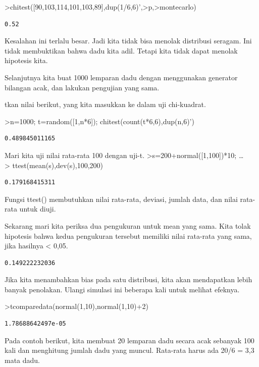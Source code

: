 \documentclass[
]{book}
\begin{document}
\textgreater chitest({[}90,103,114,101,103,89{]},dup(1/6,6)',\textgreater p,\textgreater montecarlo)

\begin{verbatim}
0.52
\end{verbatim}

Kesalahan ini terlalu besar. Jadi kita tidak bisa menolak distribusi seragam. Ini tidak membuktikan bahwa dadu kita adil. Tetapi kita tidak dapat menolak hipotesis kita.

Selanjutnya kita buat 1000 lemparan dadu dengan menggunakan generator bilangan acak, dan lakukan pengujian yang sama.

tkan nilai berikut, yang kita masukkan ke dalam uji chi-kuadrat.

\textgreater n=1000; t=random({[}1,n*6{]}); chitest(count(t*6,6),dup(n,6)')

\begin{verbatim}
0.489845011165
\end{verbatim}

Mari kita uji nilai rata-rata 100 dengan uji-t. \textgreater s=200+normal({[}1,100{]})*10; \ldots{}\\
\textgreater{} ttest(mean(s),dev(s),100,200)

\begin{verbatim}
0.179168415311
\end{verbatim}

Fungsi ttest() membutuhkan nilai rata-rata, deviasi, jumlah data, dan nilai rata-rata untuk diuji.

Sekarang mari kita periksa dua pengukuran untuk mean yang sama. Kita tolak hipotesis bahwa kedua pengukuran tersebut memiliki nilai rata-rata yang sama, jika hasilnya \textless{} 0,05.

\begin{verbatim}
0.149222232036
\end{verbatim}

Jika kita menambahkan bias pada satu distribusi, kita akan mendapatkan lebih banyak penolakan. Ulangi simulasi ini beberapa kali untuk melihat efeknya.

\textgreater tcomparedata(normal(1,10),normal(1,10)+2)

\begin{verbatim}
1.78688642497e-05
\end{verbatim}

Pada contoh berikut, kita membuat 20 lemparan dadu secara acak sebanyak 100 kali dan menghitung jumlah dadu yang muncul. Rata-rata harus ada 20/6 = 3,3 mata dadu.
\end{document}
